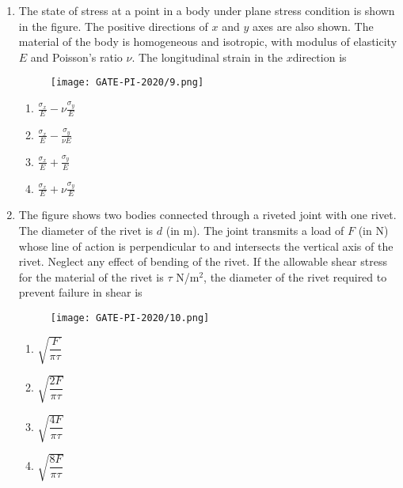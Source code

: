 \documentclass[journal,12pt,onecolumn]{IEEEtran}
\theoremstyle{remark}
\begin{document}
\begin{enumerate}
\item The state of stress at a point in a body under plane stress condition is shown in the figure. The positive directions of $x$ and $y$ axes are also shown. The material of the body is homogeneous and isotropic, with modulus of elasticity $E$ and Poisson's ratio $\nu$. The longitudinal strain in the $x$direction is
\begin{figure}[H]
    \centering
    \texttt{[image: GATE-PI-2020/9.png]} %
    \caption{}
    \label{fig:planestress}
\end{figure}
\begin{multicols}{4}
\begin{enumerate}
    \item $\frac{\sigma_x}{E} - \nu\frac{\sigma_y}{E}$
    \item $\frac{\sigma_x}{E} - \frac{\sigma_y}{\nu E}$
    \item $\frac{\sigma_x}{E} + \frac{\sigma_y}{E}$
    \item $\frac{\sigma_x}{E} + \nu\frac{\sigma_y}{E}$
\end{enumerate}
\end{multicols}
\vspace{1cm}

\item The figure shows two bodies connected through a riveted joint with one rivet. The diameter of the rivet is $d$ (in m). The joint transmits a load of $F$ (in N) whose line of action is perpendicular to and intersects the vertical axis of the rivet. Neglect any effect of bending of the rivet. If the allowable shear stress for the material of the rivet is $\tau$ N/m$^2$, the diameter of the rivet required to prevent failure in shear is
\begin{figure}[H]
    \centering
    \texttt{[image: GATE-PI-2020/10.png]}
    \caption{}
    \label{fig:rivetjoint}
\end{figure}
\begin{multicols}{4}
\begin{enumerate}
    \item $ \sqrt{\dfrac{F}{\pi \tau}} $
    \item $ \sqrt{\dfrac{2F}{\pi \tau}} $
    \item $ \sqrt{\dfrac{4F}{\pi \tau}} $
    \item $ \sqrt{\dfrac{8F}{\pi \tau}} $
\end{enumerate}
\end{multicols}
\vspace{1cm}


\end{enumerate}
\end{document}
